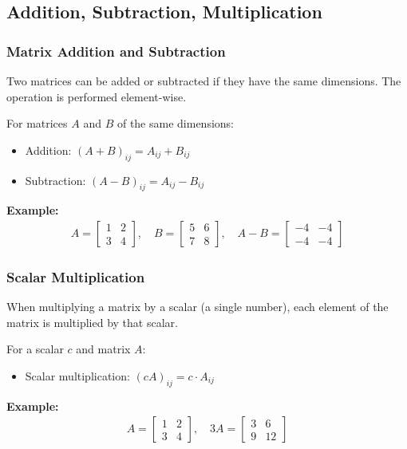 \documentclass{article}
\begin{document}
\subsection{Addition, Subtraction, Multiplication}

\subsubsection{Matrix Addition and Subtraction}
Two matrices can be added or subtracted if they have the same dimensions. The operation is performed element-wise.

For matrices $A$ and $B$ of the same dimensions:
\begin{itemize}
    \item Addition: $(A + B)_{ij} = A_{ij} + B_{ij}$
    \item Subtraction: $(A - B)_{ij} = A_{ij} - B_{ij}$
\end{itemize}

\textbf{Example:}
\begin{align}
A = \begin{bmatrix} 
1 & 2 \\
3 & 4
\end{bmatrix}, \quad 
B = \begin{bmatrix} 
5 & 6 \\
7 & 8
\end{bmatrix}, \quad 
A - B = \begin{bmatrix} 
-4 & -4 \\
-4 & -4
\end{bmatrix}
\end{align}

\subsubsection{Scalar Multiplication}
When multiplying a matrix by a scalar (a single number), each element of the matrix is multiplied by that scalar.

For a scalar $c$ and matrix $A$:
\begin{itemize}
    \item Scalar multiplication: $(cA)_{ij} = c \cdot A_{ij}$
\end{itemize}

\textbf{Example:}
\begin{align}
A = \begin{bmatrix} 
1 & 2 \\
3 & 4
\end{bmatrix}, \quad 
3A = \begin{bmatrix} 
3 & 6 \\
9 & 12
\end{bmatrix}
\end{align}
\end{document}
